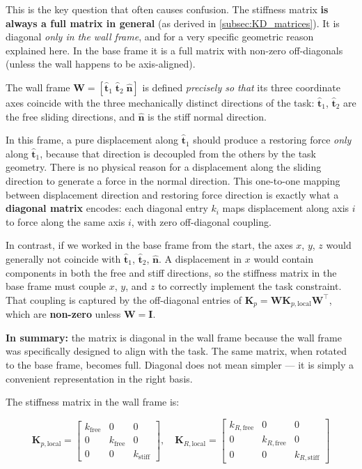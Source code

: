 \begin{remark}
This is the key question that often causes confusion.
The stiffness matrix \textbf{is always a full  matrix in general}
(as derived in \cref{subsec:KD_matrices}).
It is diagonal \emph{only in the wall frame}, and for a very specific
geometric reason explained here.
In the base frame it is a full matrix with non-zero off-diagonals
(unless the wall happens to be axis-aligned).
\end{remark}

The wall frame $\mathbf{W} = [\hat{\mathbf{t}}_1\;\hat{\mathbf{t}}_2\;\hat{\mathbf{n}}]$
is defined \emph{precisely so that} its three coordinate axes coincide
with the three mechanically distinct directions of the task:
$\hat{\mathbf{t}}_1$, $\hat{\mathbf{t}}_2$ are the free sliding directions,
and $\hat{\mathbf{n}}$ is the stiff normal direction.

In this frame, a pure displacement along $\hat{\mathbf{t}}_1$ should
produce a restoring force \emph{only} along $\hat{\mathbf{t}}_1$, because
that direction is decoupled from the others by the task geometry.
There is no physical reason for a displacement along the sliding direction
to generate a force in the normal direction.
This one-to-one mapping between displacement direction and restoring force
direction is exactly what a \textbf{diagonal matrix} encodes: each diagonal
entry $k_i$ maps displacement along axis $i$ to force along the same axis $i$,
with zero off-diagonal coupling.

In contrast, if we worked in the base frame from the start, the axes $x$,
$y$, $z$ would generally not coincide with $\hat{\mathbf{t}}_1$,
$\hat{\mathbf{t}}_2$, $\hat{\mathbf{n}}$.
A displacement in $x$ would contain components in both the free and stiff
directions, so the stiffness matrix in the base frame must couple $x$, $y$,
and $z$ to correctly implement the task constraint.
That coupling is captured by the off-diagonal entries of
$\mathbf{K}_p = \mathbf{W}\mathbf{K}_{p,\mathrm{local}}\mathbf{W}^\top$,
which are \textbf{non-zero} unless $\mathbf{W}=\mathbf{I}$.

\textbf{In summary:} the matrix is diagonal in the wall frame because the
wall frame was specifically designed to align with the task.
The same matrix, when rotated to the base frame, becomes full.
Diagonal does not mean simpler — it is simply a convenient representation
in the right basis.

The stiffness matrix in the wall frame is:

\begin{equation}
\label{eq:K_wall}
\mathbf{K}_{p,\mathrm{local}} =
\begin{bmatrix}
k_{\mathrm{free}}  & 0 & 0 \\
0 & k_{\mathrm{free}}  & 0 \\
0 & 0 & k_{\mathrm{stiff}}
\end{bmatrix},
\quad
\mathbf{K}_{R,\mathrm{local}} =
\begin{bmatrix}
k_{R,\mathrm{free}}  & 0 & 0 \\
0 & k_{R,\mathrm{free}}  & 0 \\
0 & 0 & k_{R,\mathrm{stiff}}
\end{bmatrix}
\end{equation}


